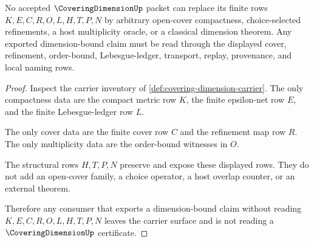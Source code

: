 \begin{theorem}
\label{thm:covering-dimension-ledger-non-escape}
No accepted $\CoveringDimensionUp$ packet can replace its finite rows $K,E,C,R,O,L,H,T,P,N$ by arbitrary open-cover compactness, choice-selected refinements, a host multiplicity oracle, or a classical dimension theorem. Any exported dimension-bound claim must be read through the displayed cover, refinement, order-bound, Lebesgue-ledger, transport, replay, provenance, and local naming rows.
\end{theorem}
\begin{proof}
Inspect the carrier inventory of \autoref{def:covering-dimension-carrier}. The only compactness data are the compact metric row $K$, the finite epsilon-net row $E$, and the finite Lebesgue-ledger row $L$.

The only cover data are the finite cover row $C$ and the refinement map row $R$. The only multiplicity data are the order-bound witnesses in $O$.

The structural rows $H,T,P,N$ preserve and expose these displayed rows. They do not add an open-cover family, a choice operator, a host overlap counter, or an external theorem.

Therefore any consumer that exports a dimension-bound claim without reading $K,E,C,R,O,L,H,T,P,N$ leaves the carrier surface and is not reading a $\CoveringDimensionUp$ certificate.
\end{proof}

